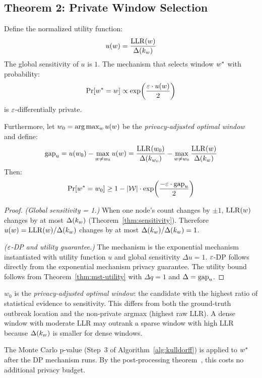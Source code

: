 
\subsection{Theorem 2: Private Window Selection}
\label{sec:method:mechanism}

\begin{theorem}
\label{thm:mechanism}
Define the normalized utility function:
\[
    u(w) = \frac{\mathrm{LLR}(w)}{\Delta(k_w)}
\]
The global sensitivity of $u$ is $1$.
The mechanism that selects window $w^*$ with probability:
\[
    \Pr[w^* = w] \propto \exp\!\left(\frac{\varepsilon \cdot u(w)}{2}\right)
\]
is $\varepsilon$-differentially private.

Furthermore, let $w_0 = \arg\max_w u(w)$ be the \emph{privacy-adjusted optimal window}
and define:
\[
    \mathrm{gap}_u = u(w_0) - \max_{w \neq w_0} u(w) = \frac{\mathrm{LLR}(w_0)}{\Delta(k_{w_0})} - \max_{w \neq w_0}\frac{\mathrm{LLR}(w)}{\Delta(k_w)}
\]
Then:
\[
    \Pr[w^* = w_0] \geq 1 - |\mathcal{W}| \cdot \exp\!\left(\frac{-\varepsilon \cdot \mathrm{gap}_u}{2}\right)
\]
\end{theorem}

\begin{proof}
\textit{(Global sensitivity = 1.)}
When one node's count changes by $\pm 1$, $\mathrm{LLR}(w)$ changes by at most $\Delta(k_w)$
(Theorem~\ref{thm:sensitivity}).
Therefore $u(w) = \mathrm{LLR}(w)/\Delta(k_w)$ changes by at most $\Delta(k_w)/\Delta(k_w) = 1$.

\textit{($\varepsilon$-DP and utility guarantee.)}
The mechanism is the exponential mechanism~\cite{mcsherry2007} instantiated with
utility function $u$ and global sensitivity $\Delta u = 1$.
$\varepsilon$-DP follows directly from the exponential mechanism privacy guarantee.
The utility bound follows from Theorem~\ref{thm:mst-utility} with $\Delta q = 1$
and $\Delta = \mathrm{gap}_u$.
\end{proof}

\begin{remark}
$w_0$ is the \emph{privacy-adjusted optimal window}: the candidate with the highest
ratio of statistical evidence to sensitivity.
This differs from both the ground-truth outbreak location and the non-private argmax
(highest raw LLR).
A dense window with moderate LLR may outrank a sparse window with high LLR because
$\Delta(k_w)$ is smaller for dense windows.
\end{remark}

\begin{remark}
The Monte Carlo p-value (Step~3 of Algorithm~\ref{alg:kulldorff}) is applied to $w^*$
after the DP mechanism runs.
By the post-processing theorem~\cite[Proposition~2.1]{dwork2013}, this costs no
additional privacy budget.
\end{remark}

